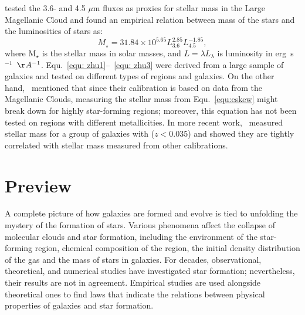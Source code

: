 \cite{Eskew12} tested the 3.6- and 4.5 $\mu$m fluxes as proxies for stellar mass in the Large Magellanic Cloud and found an empirical relation between mass of the stars and the luminosities of stars as:
\begin{equation}
\label{equ:eskew}
  M_{\star} = 31.84 \times 10^{5.65} L_{3.6}^{2.85} L_{4.5}^{-1.85},
\end{equation}
where M$_{\star}$ is the stellar mass in solar masses, and $L = \lambda L_{\lambda}$ is luminosity in erg~s$^{-1}$~$\AA^{-1}$.
Equ.~\ref{equ: zhu1}--~\ref{equ: zhu3} were derived from a large sample of galaxies and tested on different types of regions and galaxies.
On the other hand,~\cite{Eskew12} mentioned that since their calibration is based on data from the Magellanic Clouds,
measuring the stellar mass from Equ.~\ref{equ:eskew} might break down for highly star-forming regions; moreover, this equation has not been tested on regions with different metallicities. 
In more recent work,~\cite{Laura16} measured stellar mass for a group of galaxies with ($z < 0.035$) and showed they are tightly correlated with stellar mass measured from other calibrations. %


\section{Preview}
\label{sec: pre_intro}

A complete picture of how galaxies are formed and evolve is tied to unfolding the mystery of the formation of stars.
Various phenomena affect the collapse of molecular clouds and star formation, including the environment of the star-forming region, chemical composition of the region, the initial density distribution of the gas and the mass of stars in galaxies.
For decades, observational, theoretical, and numerical studies have investigated star formation; nevertheless, their results are not in agreement.
Empirical studies are used alongside theoretical ones to find laws that indicate the relations between physical properties of galaxies and star formation.


